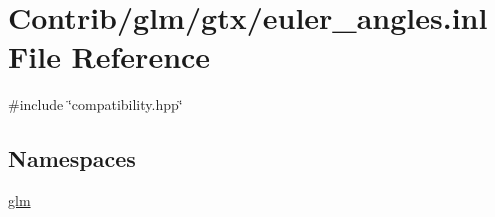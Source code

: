 \hypertarget{euler__angles_8inl}{}\section{Contrib/glm/gtx/euler\+\_\+angles.inl File Reference}
\label{euler__angles_8inl}
{\ttfamily \#include \char`\"{}compatibility.\+hpp\char`\"{}}\newline
\subsection*{Namespaces}
\begin{DoxyCompactItemize}
\item 
 \mbox{\hyperlink{namespaceglm}{glm}}
\end{DoxyCompactItemize}
